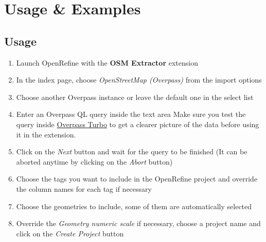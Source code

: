 \section{Usage \& Examples}
\subsection{Usage}
\begin{enumerate}
    \item Launch OpenRefine with the \textbf{OSM Extractor} extension
    \item In the index page, choose \textit{OpenStreetMap (Overpass)} from the import options
    \item Choose another Overpass instance or leave the default one in the select list
    \item Enter an Overpass QL query inside the text area
        \subitem Make sure you test the query inside \href{https://overpass-turbo.eu/}{Overpass Turbo} to get a clearer
        picture of the data before using it in the extension.
    \item Click on the \textit{Next} button and wait for the query to be finished (It can be aborted anytime by clicking on the \textit{Abort} button)
    \item Choose the tags you want to include in the OpenRefine project and override the column names for each tag if necessary
    \item Choose the geometries to include, some of them are automatically selected
    \item Override the \textit{Geometry numeric scale} if necessary, choose a project name and click on the \textit{Create Project} button
\end{enumerate}
